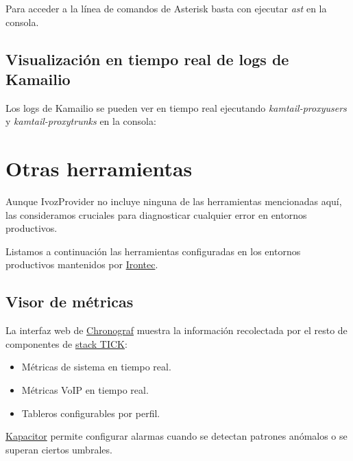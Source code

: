 \documentclass[letterpaper,10pt,spanish]{sphinxmanual}
\begin{document}
Para acceder a la línea de comandos de Asterisk basta con ejecutar \emph{ast} en la consola.


\subsection{Visualización en tiempo real de logs de Kamailio}
\label{security_and_maintenance/maintenance/log_viewer:kamailio-realtime-log-viewing}
Los logs de Kamailio se pueden ver en tiempo real ejecutando \emph{kamtail-proxyusers} y \emph{kamtail-proxytrunks} en la consola:

\noindent{}


\section{Otras herramientas}
\label{security_and_maintenance/maintenance/other_tools::doc}\label{security_and_maintenance/maintenance/other_tools:other-tools}
Aunque IvozProvider no incluye ninguna de las herramientas mencionadas aquí, las consideramos cruciales para diagnosticar cualquier error en entornos productivos.

Listamos a continuación las herramientas configuradas en los entornos productivos mantenidos por \href{https://www.irontec.com}{Irontec}.


\subsection{Visor de métricas}
\label{security_and_maintenance/maintenance/other_tools:metrics-viewer}
La interfaz web de \href{https://www.influxdata.com/time-series-platform/chronograf/}{Chronograf} muestra la información recolectada por el resto de componentes de \href{https://www.influxdata.com/time-series-platform/}{stack TICK}:
\begin{itemize}
\item {} 
Métricas de sistema en tiempo real.

\item {} 
Métricas VoIP en tiempo real.

\item {} 
Tableros configurables por perfil.

\end{itemize}

\href{https://www.influxdata.com/time-series-platform/kapacitor/}{Kapacitor} permite configurar alarmas cuando se detectan patrones anómalos  o se superan ciertos umbrales.
\end{document}
